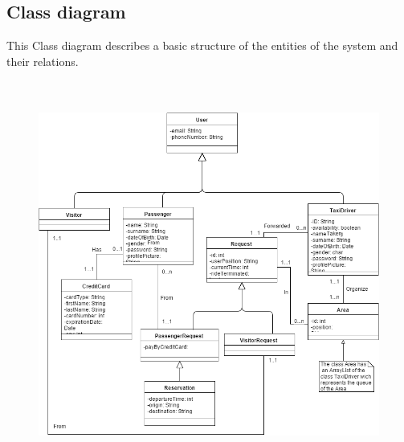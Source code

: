 \documentclass[18pt,oneside,a4paper, titlepage]{article}
\begin{document}
	\subsection{Class diagram}
	This Class diagram describes a basic structure of the entities of the system and their relations.
	\\ \\ \\ 
	\begin{figure}[h]
		\includegraphics[scale=0.55]{classDiagram.png}
	\end{figure}
\newpage
\end{document}
